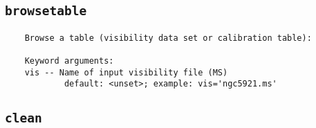 \subsection{{\tt browsetable}}
\label{section:tasks.browsetable}

\small
\begin{verbatim}
    Browse a table (visibility data set or calibration table):
    
    Keyword arguments:
    vis -- Name of input visibility file (MS)
            default: <unset>; example: vis='ngc5921.ms'

\end{verbatim}
\normalsize


\subsection{{\tt clean}}
\label{section:tasks.clean}

